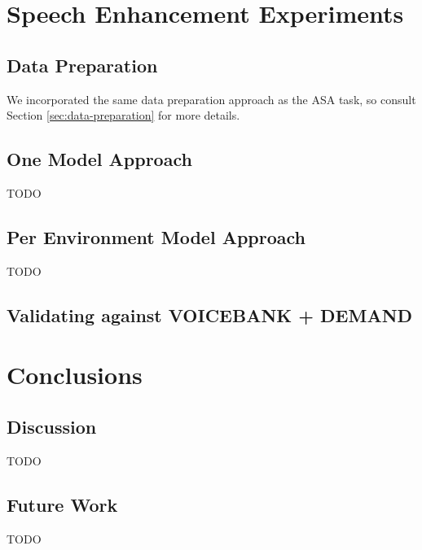 \documentclass[logo,bsc,singlespacing,parskip,online]{infthesis}
\begin{document}
\chapter{Speech Enhancement Experiments}
\section{Data Preparation}
We incorporated the same data preparation approach as the ASA task, so consult Section \ref{sec:data-preparation} for more details.
\section{One Model Approach}
TODO
\section{Per Environment Model Approach}
TODO
\section{Validating against VOICEBANK + DEMAND}

\chapter{Conclusions}
\section{Discussion}
TODO
\section{Future Work}
TODO











\end{document}
